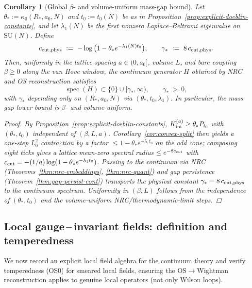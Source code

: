 \documentclass[11pt]{amsart}
\theoremstyle{plain}
\newtheorem{corollary}[theorem]{Corollary}
\theoremstyle{definition}
\theoremstyle{remark}
\begin{document}
\medskip

\begin{corollary}[Global $\beta$- and volume-uniform mass-gap bound]\label{cor:global-uniform-gap}
Let $\theta_*:=\kappa_0(R_*,a_0,N)$ and $t_0:=t_0(N)$ be as in Proposition~\ref{prop:explicit-doeblin-constants}, and let $\lambda_1(N)$ be the first nonzero Laplace--Beltrami eigenvalue on $\mathrm{SU}(N)$. Define
\[
  c_{\rm cut,phys}\ :=\ -\log\big(1-\theta_* e^{-\lambda_1(N) t_0}\big),\qquad \gamma_*\ :=\ 8\,c_{\rm cut,phys}.
\]
Then, uniformly in the lattice spacing $a\in(0,a_0]$, volume $L$, and bare coupling $\beta\ge 0$ along the van Hove window, the continuum generator $H$ obtained by NRC and OS reconstruction satisfies
\[
  \operatorname{spec}(H)\subset\{0\}\cup[\gamma_*,\infty),\qquad \gamma_*\ >\ 0,
\]
with $\gamma_*$ depending only on $(R_*,a_0,N)$ via $(\theta_*,t_0,\lambda_1)$. In particular, the mass gap lower bound is $\beta$- and volume-uniform.

\begin{proof}
By Proposition~\ref{prop:explicit-doeblin-constants}, $K_{\rm int}^{(a)}\ge \theta_* P_{t_0}$ with $(\theta_*,t_0)$ independent of $(\beta,L,a)$. Corollary~\ref{cor:convex-split} then yields a one-step $L^2_0$ contraction by a factor $\le 1-\theta_* e^{-\lambda_1 t_0}$ on the odd cone; composing eight ticks gives a lattice mean-zero spectral radius $\le e^{-8 c_{\rm cut}}$ with $c_{\rm cut} = -(1/a)\log(1-\theta_* e^{-\lambda_1 t_0})$. Passing to the continuum via NRC (Theorems~\ref{thm:nrc-embeddings}, \ref{thm:nrc-quant}) and gap persistence (Theorem~\ref{thm:gap-persist-cont}) transports the physical constant $\gamma_* = 8\,c_{\rm cut,phys}$ to the continuum spectrum. Uniformity in $(\beta,L)$ follows from the independence of $(\theta_*,t_0)$ and the volume-uniform NRC/thermodynamic-limit steps.
\end{proof}
\end{corollary}
\subsection*{Local gauge\,–\,invariant fields: definition and temperedness}
\label{subsec:local-fields-tempered}

We now record an explicit local field algebra for the continuum theory and verify temperedness (OS0) for smeared local fields, ensuring the OS$\to$Wightman reconstruction applies to genuine local operators (not only Wilson loops).
\end{document}
